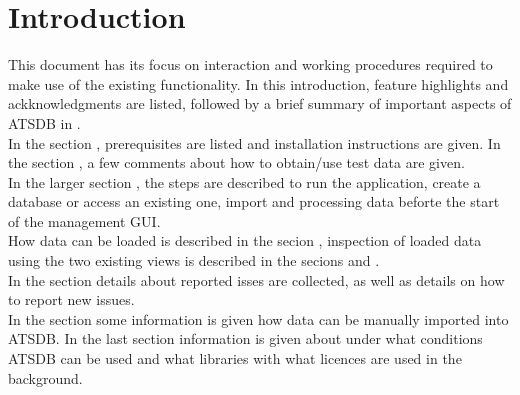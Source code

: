 \chapter{Introduction}

This document has its focus on interaction and working procedures required to make use of the existing
functionality. In this introduction, feature highlights and ackknowledgments are listed, followed by a brief summary of important aspects of  ATSDB in . \\

In the section , prerequisites are listed and installation instructions are given. In the section , a few comments about how to obtain/use test data are given. \\

In the larger section , the steps are described to run the application, create a database or access an existing one, import and processing data beforte the start of the management GUI. \\

How data can be loaded is described in the secion , inspection of loaded data using the two existing views is described in the secions  and . \\

In the section  details about reported isses are collected, as well as details on how to report new issues. \\

In the section  some information is given how data can be manually imported into ATSDB. In the last section  information is given about under what conditions ATSDB can be used and what libraries with what licences are used in the background.












